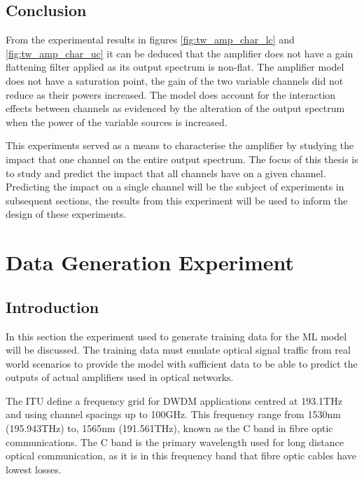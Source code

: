 \subsection{Conclusion}
From the experimental results in figures \ref{fig:tw_amp_char_lc} and \ref{fig:tw_amp_char_uc} it can be deduced that the amplifier does not have a gain flattening filter applied as its output spectrum is non-flat. The amplifier model does not have a saturation point, the gain of the two variable channels did not reduce as their powers increased. The model does account for the interaction effects between channels as evidenced by the alteration of the output spectrum when the power of the variable sources is increased.

This experiments served as a means to characterise the amplifier by studying the impact that one channel on the entire output spectrum. The focus of this thesis is to study and predict the impact that all channels have on a given channel. Predicting the impact on a single channel will be the subject of experiments in subsequent sections, the results from this experiment will be used to inform the design of these experiments.




\FloatBarrier
\section{Data Generation Experiment}
\label{tw:sec:data_gen}

\subsection{Introduction}

In this section  the experiment used to generate training data for the ML model will be discussed. The training data must emulate optical signal traffic from real world scenarios to provide the model with sufficient data to be able to predict the outputs of actual amplifiers used in optical networks.

The ITU define a frequency grid for DWDM applications centred at 193.1THz and using channel spacings up to 100GHz. This frequency range from 1530nm (195.943THz) to, 1565nm (191.561THz), known as the C band in fibre optic communications. The C band is the primary wavelength used for long distance optical communication, as it is in this frequency band that fibre optic cables have lowest losses. 

